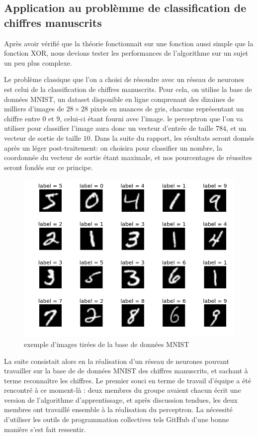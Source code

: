 \documentclass[
    10pt,
    a4paper,
    oneside,
    headinclude,footinclude,
    BCOR=5mm,
    captions=tableabove
]{scrartcl}
\begin{document}
\subsection{Application au problèmme de classification de chiffres manuscrits}

Après avoir vérifié que la théorie fonctionnait sur une fonction aussi simple que la fonction XOR, nous devions tester les performances de l'algorithme sur un sujet un peu plus complexe.

Le problème classique que l'on a choisi de résoudre avec un réseau de neurones est celui de la classification de chiffres manuscrits. Pour cela, on utilise la base de données MNIST, un dataset disponible en ligne comprenant des dizaines de milliers d'images de $28\times 28$ pixels en nuances de gris, chacune représentant un chiffre entre $0$ et $9$, celui-ci étant fourni avec l'image. le perceptron que l'on va utiliser pour classifier l'image aura donc un vecteur d'entrée de taille $784$, et un vecteur de sortie de taille $10$. Dans la suite du rapport, les résultats seront donnés après un léger post-traitement: on choisira pour classifier un nombre, la coordonnée du vecteur de sortie étant maximale, et nos pourcentages de réussites seront fondés sur ce principe.

\begin{figure}[h!]
\includegraphics[width=0.8 \linewidth]{MNIST.png}
\centering
 \caption{exemple d'images tirées de la base de données MNIST}
 \label{fig:MNIST}
\end{figure}

La suite consistait alors en la réalisation d'un réseau de neurones pouvant travailler sur la base de de données MNIST des chiffres manuscrits, et sachant à terme reconnaître les chiffres. Le premier souci en terme de travail d'équipe a été rencontré à ce moment-là : deux membres du groupe avaient chacun écrit une version de l'algorithme d'apprentissage, et après discussion tendues, les deux membres ont travaillé ensemble à la réalisation du perceptron. La nécessité d'utiliser les outils de programmation collectives tels GitHub d'une bonne manière s'est fait ressentir.
\vspace{5mm}
\end{document}
